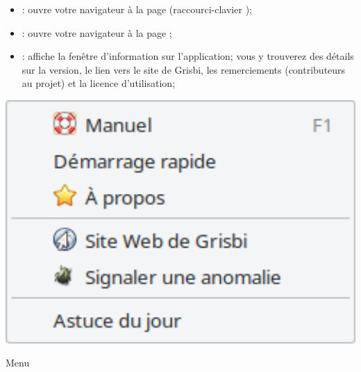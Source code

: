\vspace{3mm}
\noindent
\begin{minipage}{.7\linewidth}
	\begin{itemize}[rightmargin=.6cm]
		\item {}: ouvre votre navigateur à la page  (raccourci-clavier );
		\item {}: ouvre votre navigateur à la page ;
		\item {}: affiche la fenêtre d'information sur l'application; vous y trouverez des détails sur la version, le lien vers le site de Grisbi, les remerciements (contributeurs au projet) et la licence d'utilisation;
	\end{itemize}
\end{minipage}
\hspace{10pt}	
\begin{minipage}{.3\linewidth}
	\centering						%
	\includegraphics[width=1\textwidth]{image/screenshot/home_menubar_help}
	\vspace{-15pt}					%
	\captionsetup{
		type=figure,%
		name=Fig.,%
		labelsep=newline}			%
	\caption{Menu }	%
	\label{home_menubar_help}
\end{minipage} 

